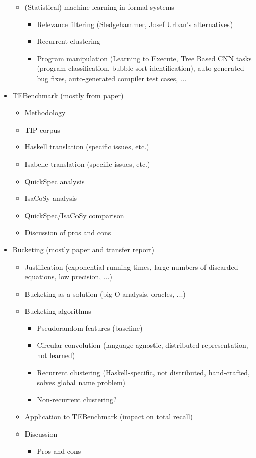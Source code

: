 \documentclass{article}
\begin{document}
\begin{itemize}
\begin{itemize}
\begin{itemize}
    \end{itemize}
  \item (Statistical) machine learning in formal systems
    \begin{itemize}
    \item Relevance filtering (Sledgehammer, Josef Urban's alternatives)
    \item Recurrent clustering
    \item Program manipulation (Learning to Execute, Tree Based CNN tasks
      (program classification, bubble-sort identification), auto-generated bug
      fixes, auto-generated compiler test cases, ...
    \end{itemize}
  \end{itemize}

\item TEBenchmark (mostly from paper)
  \begin{itemize}
    \item Methodology
    \item TIP corpus
    \item Haskell translation (specific issues, etc.)
    \item Isabelle translation (specific issues, etc.)
    \item QuickSpec analysis
    \item IsaCoSy analysis
    \item QuickSpec/IsaCoSy comparison
    \item Discussion of pros and cons
  \end{itemize}

\item Bucketing (mostly paper and transfer report)
  \begin{itemize}
  \item Justification (exponential running times, large numbers of discarded
    equations, low precision, ...)
  \item Bucketing as a solution (big-O analysis, oracles, ...)
  \item Bucketing algorithms
    \begin{itemize}
    \item Pseudorandom features (baseline)
    \item Circular convolution (language agnostic, distributed representation,
      not learned)
    \item Recurrent clustering (Haskell-specific, not distributed, hand-crafted,
      solves global name problem)
    \item Non-recurrent clustering?
    \end{itemize}
  \item Application to TEBenchmark (impact on total recall)
  \item Discussion
    \begin{itemize}
    \item Pros and cons
    \end{itemize}
  \end{itemize}


\end{itemize}
\end{document}
